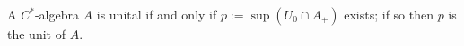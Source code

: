 A $C^*$-algebra $A$ is unital if and only if $p := \sup(U_0 \cap A_+)$ exists; if so then $p$ is the unit of $A$.
